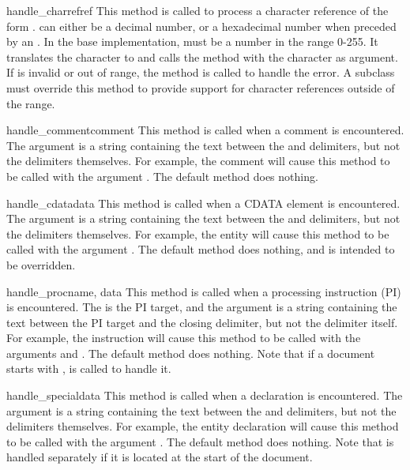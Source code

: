 \begin{methoddesc}{handle_charref}{ref}
This method is called to process a character reference of the form
.   can either be a decimal number,
or a hexadecimal number when preceded by an .
In the base implementation,  must be a number in the
range 0-255.  It translates the character to \ASCII{} and calls the
method  with the character as argument.  If
 is invalid or out of range, the method
 is called to handle the error.  A
subclass must override this method to provide support for character
references outside of the \ASCII{} range.
\end{methoddesc}

\begin{methoddesc}{handle_comment}{comment}
This method is called when a comment is encountered.  The
 argument is a string containing the text between the
\samp{<!--} and \samp{-->} delimiters, but not the delimiters
themselves.  For example, the comment  will
cause this method to be called with the argument .  The
default method does nothing.
\end{methoddesc}

\begin{methoddesc}{handle_cdata}{data}
This method is called when a CDATA element is encountered.  The
 argument is a string containing the text between the
\samp{<![CDATA[} and \samp{]]>} delimiters, but not the delimiters
themselves.  For example, the entity \samp{<![CDATA[text]]>} will
cause this method to be called with the argument .  The
default method does nothing, and is intended to be overridden.
\end{methoddesc}

\begin{methoddesc}{handle_proc}{name, data}
This method is called when a processing instruction (PI) is
encountered.  The  is the PI target, and the 
argument is a string containing the text between the PI target and the
closing delimiter, but not the delimiter itself.  For example, the
instruction  will cause this method to be called
with the arguments  and .  The default method
does nothing.  Note that if a document starts with ,  is called to handle it.
\end{methoddesc}

\begin{methoddesc}{handle_special}{data}
This method is called when a declaration is encountered.  The
 argument is a string containing the text between the
\samp{<!} and \samp{>} delimiters, but not the delimiters
themselves.  For example, the entity
declaration  will cause this method to be called
with the argument .  The default method does
nothing.  Note that  is handled separately if it
is located at the start of the document.
\end{methoddesc}

